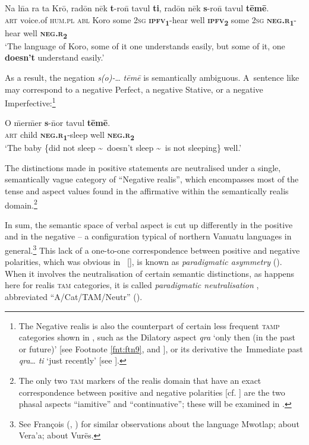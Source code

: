 \documentclass[output=paper,colorlinks,citecolor=brown,draft]{langscibook}
\begin{document}
\ea\label{ex:dor:koro} 
    \gll  Na l\={n}a ra ta Krō, radōn nēk \textbf{t}-ro\={n} tavul \textbf{ti}, radōn nēk \textbf{s}-ro\={n} tavul \textbf{tēmē}.\\ 
          \textsc{art} voice.of \textsc{hum.pl} \textsc{abl} Koro some \textsc{2sg} \textbf{\textsc{ipfv}\textsubscript{1}}-hear well \textbf{\textsc{ipfv}\textsubscript{2}} some \textsc{\textsc{2sg}} \textbf{\textsc{neg.r}\textsubscript{1}}-hear well \textbf{\textsc{neg.r}\textsubscript{2}}\\
    \glt ‘The language of Koro, some of it one understands easily, but some of it, one \textbf{doesn’t} understand easily.’ \quad  [\textsc{af.bp3}.18b] 
\z 

As a result, the negation \textit{s(o)-}… \textit{tēmē} is semantically ambiguous. A~sentence like  may correspond to a negative Perfect, a negative Stative, or a negative Imperfective:\footnote{The Negative realis is also the counterpart of certain less frequent \textsc{tamp} categories shown in , such as the Dilatory aspect \textit{qra} ‘only then (in the past or future)’ [see Footnote \ref{fnt:ftn9}, and ], or its derivative the~Immediate past \textit{qra}… \textit{ti} ‘just recently’ [see ].}

\ea\label{ex:dor:baby} 
    \gll O \={m}er\={m}er \textbf{s}-\={n}or tavul \textbf{tēmē}. \\ 
         \textsc{art} child \textbf{\textsc{neg.r}}\textbf{\textsubscript{1}}-sleep well \textbf{\textsc{neg.r}}\textbf{\textsubscript{2}}\\
    \glt ‘The baby \{did not sleep \textasciitilde\ doesn’t sleep \textasciitilde\ is not sleeping\} well.’
\z 

\noindent The distinctions made in positive statements are neutralised under a single, semantically vague category of “Negative realis”, which encompasses most of the tense and aspect values found in the affirmative within the semantically realis domain.\footnote{The only two \textsc{tam} markers of the realis domain that have an exact correspondence between positive and negative polarities [cf. ] are the two phasal aspects “iami\-tive” and “continu\-a\-tive”; these will be examined in .}

In sum, the semantic space of verbal aspect is cut up differently in the positive and in the negative – a configuration typical of northern Vanuatu languages in general.\footnote{See François (\citeyear[33–37]{François2003}, \citeyear[132]{François2005b}) for similar observations about the language Mwotlap; \citet[31, 52, 95]{Schnell2011} about Vera’a; \citet[461]{Malau2016} about Vurës.} This lack of a one-to-one correspondence between positive and negative polarities, which was obvious in~ [], is known as \textit{paradigmatic asymmetry} (\citealt{Miestamo2005,Miestamo2013-wals113}). When it involves the neutralisation of certain semantic distinctions, as happens here for realis \textsc{tam} categories, it is called \textit{paradigmatic neutralisation} \citep[54]{Miestamo2005}, abbreviated {“A/Cat/\nobreakdash TAM/Neutr”} (\citeyear[123]{Miestamo2005}).
\end{document}
